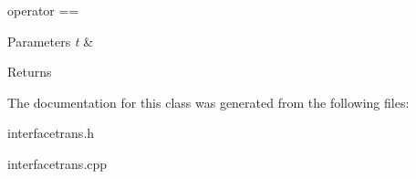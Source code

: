 operator == 


\begin{DoxyParams}{Parameters}
{\em t} & \\
\hline
\end{DoxyParams}
\begin{DoxyReturn}{Returns}

\end{DoxyReturn}


The documentation for this class was generated from the following files\+:\begin{DoxyCompactItemize}
\item 
interfacetrans.\+h\item 
interfacetrans.\+cpp\end{DoxyCompactItemize}
